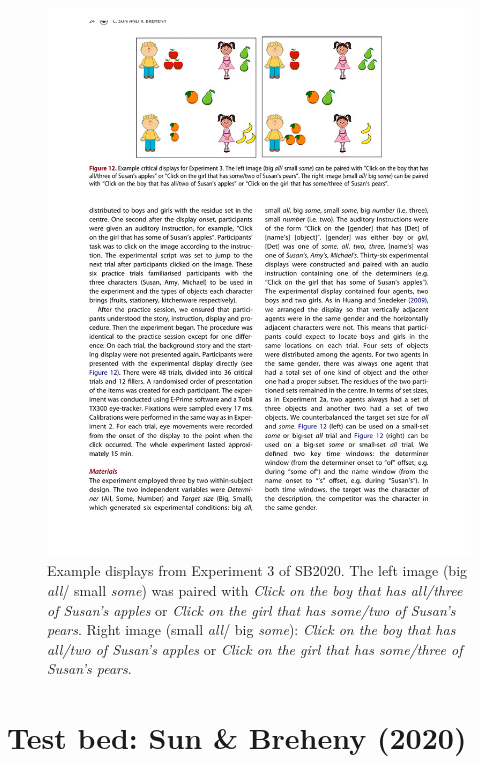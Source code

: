 \documentclass[10pt,letterpaper]{article}
\newcommand{\expref}[1]{Experiment #1}
\begin{document}
\begin{figure}[H]
\centering
\includegraphics[width=.9\columnwidth]{images/display}
\caption{Example displays from \expref{3} of SB2020. The left image (big \emph{all}/ small  \emph{some}) was paired with  \emph{Click on the boy that has all/three of Susan's apples} or  \emph{Click on the girl that has some/two of Susan's pears}. Right image (small  \emph{all}/ big  \emph{some}):  \emph{Click on the boy that has all/two of Susan's apples} or  \emph{Click on the girl that has some/three of Susan's pears}.} 
\label{fig:display}
\end{figure}

\section{Test bed: Sun \& Breheny (2020)}
\end{document}
